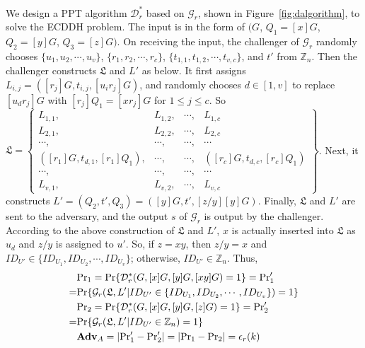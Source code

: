 We design a PPT algorithm $\mathcal{D}^*_r$ based on $\mathcal{G}_r$, shown in Figure~\ref{fig:dalgorithm}, to solve the ECDDH problem.
The input is in the form of $(G$, $Q_1=[x]G$, $Q_2=[y]G$, $Q_3=[z]G)$.
On receiving the input, the challenger of $\mathcal{G}_r$ randomly chooses
 $\{u_1, u_2, \cdots, u_v\}$, $\{r_1, r_2, \cdots, r_c\}$, $\{t_{1, 1}, t_{1, 2}, \cdots, t_{v, c}\}$, and $t'$ from $\mathbb{Z}_n$.
Then the challenger constructs $\mathfrak{L}$ and $L'$ as below.
It first assigns $L_{i, j} = ([r_j]G, t_{i, j}, [u_ir_j]G)$, %
    and randomly chooses $d \in [1, v]$ to
 replace $[u_d r_j]G$ with $[r_j]Q_1=[xr_j]G$ for $1\leq j \leq c$.
So $\mathfrak{L}=\left \{ \begin{matrix}
L_{1,1},&L_{1,2},&\cdots,&L_{1,c}\\
L_{2,1},& L_{2,2},&\cdots,&L_{2,c}\\
\cdots,&\cdots,&\cdots,&\cdots\\
([r_{1}]G, t_{d, 1}, [r_{1}]Q_1),&\cdots,&\cdots,&([r_{c}]G, t_{d, c}, [r_{c}]Q_1)\\
\cdots,&\cdots,&\cdots,&\cdots\\
L_{v,1},&L_{v,2},&\cdots,&L_{v,c}
\end{matrix}\right\}$.
%
Next, it constructs $L' = (Q_2, t', Q_3) = ([y]G, t', [z/y][y]G)$.
Finally,
    $\mathfrak{L}$ and $L'$ are sent to the adversary,
        and the output $s$ of $\mathcal{G}_r$ is output by the challenger.
According to the above construction of $\mathfrak{L}$ and $L'$,
    $x$ is actually inserted into $\mathfrak{L}$ as $u_d$
    and $z/y$ is assigned to $u'$.
So, if $z = xy$, then $z/y=x$ and $ID_{U'} \in \{ID_{U_1}, ID_{U_2}, \cdots, ID_{U_v}\}$;
    otherwise, $ID_{U'} \in \mathbb{Z}_n$.
Thus,
\begin{align*}
&{\rm Pr}_1={\rm Pr}\{\mathcal{D}^*_r(G, [x]G, [y]G, [xy]G)=1\}={\rm Pr}'_1 \\=&  {\rm Pr}\{\mathcal{G}_r(\mathfrak{L}, L'|ID_{U'} \in \{ID_{U_1}, ID_{U_2}, \cdots, ID_{U_v}\})=1\} \\
&{\rm Pr}_2={\rm Pr}\{\mathcal{D}^*_r(G, [x]G, [y]G, [z]G)=1\} ={\rm Pr}'_2 \\=&  {\rm Pr}\{\mathcal{G}_r(\mathfrak{L}, L'|ID_{U'} \in \mathbb{Z}_n)=1\}\\
&{\mathbf{Adv}}_{A}=|{\rm Pr}'_1-{\rm Pr}'_2|=|{\rm Pr}_1-{\rm Pr}_2|=\epsilon_{r}(k)
\end{align*}

